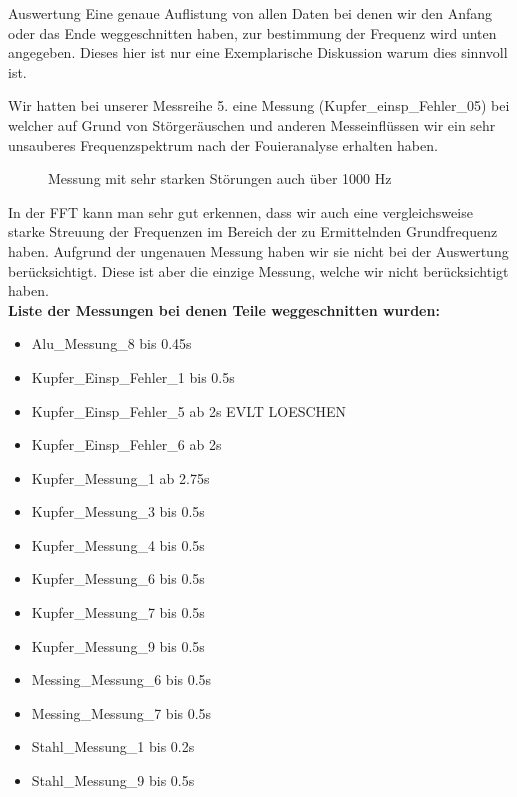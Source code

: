 \documentclass[twoside]{protokoll}
\begin{document}
\begin{aufgabe}{Auswertung}
Eine genaue Auflistung von allen Daten bei denen wir den Anfang oder das Ende weggeschnitten haben, zur bestimmung der Frequenz wird unten angegeben.
Dieses hier ist nur eine Exemplarische Diskussion warum dies sinnvoll ist.

Wir hatten bei unserer Messreihe 5. eine Messung (Kupfer\_einsp\_Fehler\_05) bei welcher auf Grund von Störgeräuschen und anderen Messeinflüssen wir ein sehr unsauberes Frequenzspektrum nach der Fouieranalyse erhalten haben.
\begin{figure}[H]
  \centering
    \caption{Messung mit sehr starken Störungen auch über 1000 Hz}
  \hfill
\end{figure}

In der FFT kann man sehr gut erkennen, dass wir auch eine vergleichsweise starke Streuung der Frequenzen im Bereich der zu Ermittelnden Grundfrequenz haben.
Aufgrund der ungenauen Messung haben wir sie nicht bei der Auswertung berücksichtigt.
Diese ist aber die einzige Messung, welche wir nicht berücksichtigt haben. \\
 

\textbf{Liste der Messungen bei denen Teile weggeschnitten wurden:}
\begin{itemize}
\item Alu\_Messung\_8 bis 0.45s
\item Kupfer\_Einsp\_Fehler\_1 bis 0.5s
\item Kupfer\_Einsp\_Fehler\_5 ab 2s EVLT LOESCHEN
\item Kupfer\_Einsp\_Fehler\_6 ab 2s
\item Kupfer\_Messung\_1 ab 2.75s
\item Kupfer\_Messung\_3 bis 0.5s
\item Kupfer\_Messung\_4 bis 0.5s
\item Kupfer\_Messung\_6 bis 0.5s
\item Kupfer\_Messung\_7 bis 0.5s
\item Kupfer\_Messung\_9 bis 0.5s
\item Messing\_Messung\_6 bis 0.5s
\item Messing\_Messung\_7 bis 0.5s
\item Stahl\_Messung\_1 bis 0.2s
\item Stahl\_Messung\_9 bis 0.5s
\end{itemize}



\end{aufgabe}
\end{document}
